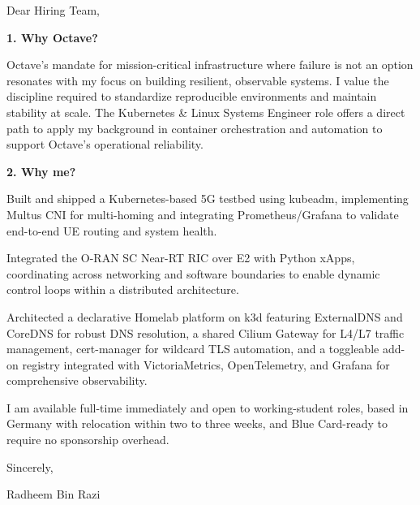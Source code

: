 \documentclass[11pt,a4paper]{coverletter}
\begin{document}

\opening{Dear Hiring Team,}

\vspace{8pt}\noindent\textbf{1. Why Octave?}\par\vspace{3pt}

Octave's mandate for mission-critical infrastructure where failure is not an option resonates with my focus on building resilient, observable systems. I value the discipline required to standardize reproducible environments and maintain stability at scale. The Kubernetes \& Linux Systems Engineer role offers a direct path to apply my background in container orchestration and automation to support Octave's operational reliability.

\vspace{8pt}\noindent\textbf{2. Why me?}\par\vspace{3pt}

\bullets

  \item Built and shipped a Kubernetes-based 5G testbed using kubeadm, implementing Multus CNI for multi-homing and integrating Prometheus/Grafana to validate end-to-end UE routing and system health.

  \item Integrated the O-RAN SC Near-RT RIC over E2 with Python xApps, coordinating across networking and software boundaries to enable dynamic control loops within a distributed architecture.

  \item Architected a declarative Homelab platform on k3d featuring ExternalDNS and CoreDNS for robust DNS resolution, a shared Cilium Gateway for L4/L7 traffic management, cert-manager for wildcard TLS automation, and a toggleable add-on registry integrated with VictoriaMetrics, OpenTelemetry, and Grafana for comprehensive observability.

\bulletsend

I am available full-time immediately and open to working-student roles, based in Germany with relocation within two to three weeks, and Blue Card-ready to require no sponsorship overhead.

\closing{Sincerely,}{Radheem Bin Razi}

\clearpage
{}

\end{document}
